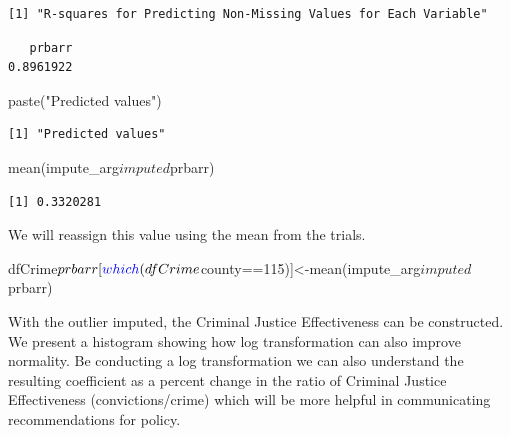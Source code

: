 \documentclass[]{article}
\newenvironment{Shaded}{}{}
\newcommand{\DecValTok}[1]{#1}
\newcommand{\KeywordTok}[1]{\textcolor[rgb]{0.00,0.00,1.00}{#1}}
\newcommand{\NormalTok}[1]{#1}
\newcommand{\OperatorTok}[1]{#1}
\newcommand{\StringTok}[1]{\textcolor[rgb]{0.00,0.50,0.50}{#1}}
\begin{document}
\begin{verbatim}
[1] "R-squares for Predicting Non-Missing Values for Each Variable"
\end{verbatim}

\begin{Shaded}
\end{Shaded}

\begin{verbatim}
   prbarr 
0.8961922 
\end{verbatim}

\begin{Shaded}
\begin{Highlighting}[]
\KeywordTok{paste}\NormalTok{(}\StringTok{"Predicted values"}\NormalTok{)}
\end{Highlighting}
\end{Shaded}

\begin{verbatim}
[1] "Predicted values"
\end{verbatim}

\begin{Shaded}
\begin{Highlighting}[]
\KeywordTok{mean}\NormalTok{(impute_arg}\OperatorTok{$}\NormalTok{imputed}\OperatorTok{$}\NormalTok{prbarr)}
\end{Highlighting}
\end{Shaded}

\begin{verbatim}
[1] 0.3320281
\end{verbatim}

We will reassign this value using the mean from the trials.

\begin{Shaded}
\begin{Highlighting}[]
\NormalTok{dfCrime}\OperatorTok{$}\NormalTok{prbarr[}\KeywordTok{which}\NormalTok{(dfCrime}\OperatorTok{$}\NormalTok{county}\OperatorTok{==}\DecValTok{115}\NormalTok{)]<-}\KeywordTok{mean}\NormalTok{(impute_arg}\OperatorTok{$}\NormalTok{imputed}\OperatorTok{$}\NormalTok{prbarr)}
\end{Highlighting}
\end{Shaded}

With the outlier imputed, the Criminal Justice Effectiveness can be
constructed. We present a histogram showing how log transformation can
also improve normality. Be conducting a log transformation we can also
understand the resulting coefficient as a percent change in the ratio of
Criminal Justice Effectiveness (convictions/crime) which will be more
helpful in communicating recommendations for policy.
\end{document}
